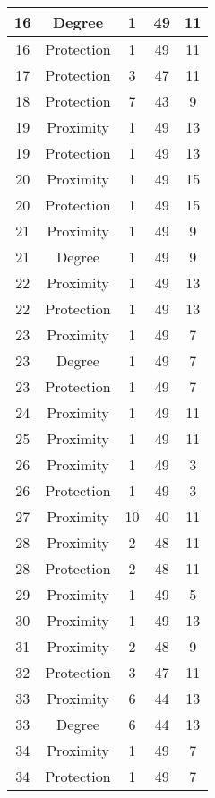 \documentclass[results.tex]{subfiles}
\begin{document}
\begin{center}
\begin{tabular}{| c || c | c | c | c |}
    \hline
    16 & Degree & 1 & 49 & 11 \\ 
    \hline
    16 & Protection & 1 & 49 & 11 \\ 
    \hline
    17 & Protection & 3 & 47 & 11 \\ 
    \hline
    18 & Protection & 7 & 43 & 9 \\ 
    \hline
    19 & Proximity & 1 & 49 & 13 \\ 
    \hline
    19 & Protection & 1 & 49 & 13 \\ 
    \hline
    20 & Proximity & 1 & 49 & 15 \\ 
    \hline
    20 & Protection & 1 & 49 & 15 \\ 
    \hline
    21 & Proximity & 1 & 49 & 9 \\ 
    \hline
    21 & Degree & 1 & 49 & 9 \\ 
    \hline
    22 & Proximity & 1 & 49 & 13 \\ 
    \hline
    22 & Protection & 1 & 49 & 13 \\ 
    \hline
    23 & Proximity & 1 & 49 & 7 \\ 
    \hline
    23 & Degree & 1 & 49 & 7 \\ 
    \hline
    23 & Protection & 1 & 49 & 7 \\ 
    \hline
    24 & Proximity & 1 & 49 & 11 \\ 
    \hline
    25 & Proximity & 1 & 49 & 11 \\ 
    \hline
    26 & Proximity & 1 & 49 & 3 \\ 
    \hline
    26 & Protection & 1 & 49 & 3 \\ 
    \hline
    27 & Proximity & 10 & 40 & 11 \\ 
    \hline
    28 & Proximity & 2 & 48 & 11 \\ 
    \hline
    28 & Protection & 2 & 48 & 11 \\ 
    \hline
    29 & Proximity & 1 & 49 & 5 \\ 
    \hline
    30 & Proximity & 1 & 49 & 13 \\ 
    \hline
    31 & Proximity & 2 & 48 & 9 \\ 
    \hline
    32 & Protection & 3 & 47 & 11 \\ 
    \hline
    33 & Proximity & 6 & 44 & 13 \\ 
    \hline
    33 & Degree & 6 & 44 & 13 \\ 
    \hline
    34 & Proximity & 1 & 49 & 7 \\ 
    \hline
    34 & Protection & 1 & 49 & 7 \\ 

\end{tabular}
\end{center}
\end{document}
